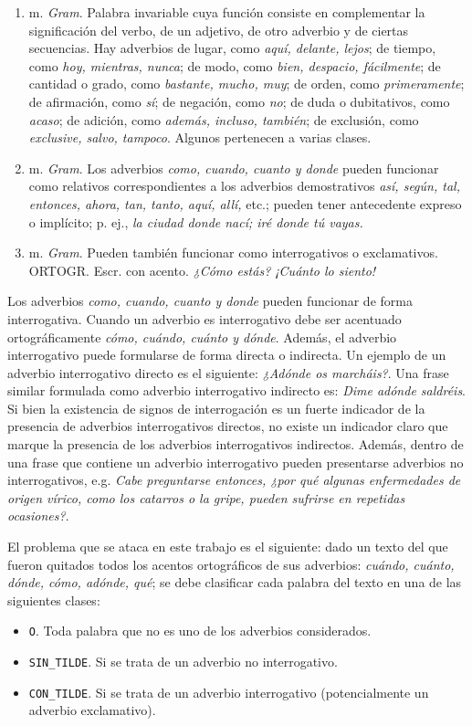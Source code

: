 \documentclass[runningheads,a4paper]{llncs}
\begin{document}
\begin{enumerate}
\item{m. \emph{Gram}. Palabra invariable cuya función consiste en complementar la significación del verbo, de un adjetivo, de otro adverbio y de ciertas secuencias. Hay adverbios de lugar, como \emph{aquí, delante, lejos}; de tiempo, como \emph{hoy, mientras, nunca}; de modo, como \emph{bien, despacio, fácilmente}; de cantidad o grado, como \emph{bastante, mucho, muy}; de orden, como \emph{primeramente}; de afirmación, como \emph{sí}; de negación, como \emph{no}; de duda o dubitativos, como \emph{acaso}; de adición, como \emph{además, incluso, también}; de exclusión, como \emph{exclusive, salvo, tampoco}. Algunos pertenecen a varias clases.}
\item{m. \emph{Gram}. Los adverbios \emph{como, cuando, cuanto y donde} pueden funcionar como relativos correspondientes a los adverbios demostrativos \emph{así, según, tal, entonces, ahora, tan, tanto, aquí, allí,} etc.; pueden tener antecedente expreso o implícito; p. ej., \emph{la ciudad donde nací; iré donde tú vayas.}}
\item{m. \emph{Gram}. Pueden también funcionar como interrogativos o exclamativos. ORTOGR. Escr. con acento. \emph{¿Cómo estás? ¡Cuánto lo siento!}}
\end{enumerate}

Los adverbios \emph{como, cuando, cuanto y donde} pueden funcionar de forma interrogativa. Cuando un adverbio es interrogativo debe ser acentuado ortográficamente \emph{cómo, cuándo, cuánto y dónde}. Además, el adverbio interrogativo puede formularse de forma directa o indirecta\cite{VECIANA04}. Un ejemplo de un adverbio interrogativo directo es el siguiente: \emph{¿Adónde os marcháis?}. Una frase similar formulada como adverbio interrogativo indirecto es: \emph{Dime adónde saldréis}. Si bien la existencia de signos de interrogación es un fuerte indicador de la presencia de adverbios interrogativos directos, no existe un indicador claro que marque la presencia de los adverbios interrogativos indirectos. Además, dentro de una frase que contiene un adverbio interrogativo pueden presentarse adverbios no interrogativos, e.g. \emph{Cabe preguntarse entonces, ¿por qué algunas enfermedades de origen vírico, como los catarros o la gripe, pueden sufrirse en repetidas ocasiones?}.

El problema que se ataca en este trabajo es el siguiente: dado un texto del que fueron quitados todos los acentos ortográficos de sus adverbios: \emph{cuándo, cuánto, dónde, cómo, adónde, qué}; se debe clasificar cada palabra del texto en una de las siguientes clases: 
\begin{itemize}
	\item {\texttt{O}}. Toda palabra que no es uno de los adverbios considerados.
	\item {\texttt{SIN\_TILDE}}. Si se trata de un adverbio no interrogativo.
	\item {\texttt{CON\_TILDE}}. Si se trata de un adverbio interrogativo (potencialmente un adverbio exclamativo).
\end{itemize}
\end{document}
